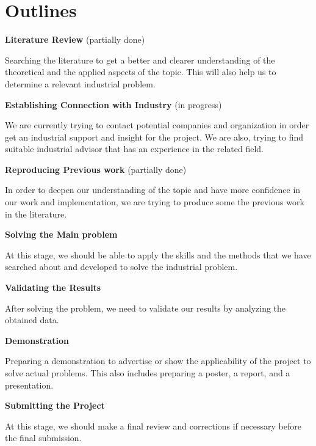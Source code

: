 \section*{Outlines}
\begin{itemize}
    {\item \textbf{Literature Review} {\footnotesize(partially done)}}

    Searching the literature to get a better and clearer understanding of the theoretical 
    and the applied aspects of the topic. This will also help us to determine a relevant industrial problem.

    {\item \textbf{Establishing Connection with Industry}
    {\footnotesize(in progress)}}

    We are currently trying to contact potential companies and organization in order get an industrial 
    support and insight for the project. We are also, trying to find suitable industrial advisor 
    that has an experience in the related field.

    {\item \textbf{Reproducing Previous work} {\footnotesize(partially done)}}

    In order to deepen our understanding of the topic and have more confidence in our work and implementation, 
    we are trying to produce some the previous work in the literature.

    {\item \textbf{Solving the Main problem }}
    
    At this stage, we should be able to apply the skills and the methods that 
    we have searched about and developed to solve the industrial problem.

     {\item \textbf{Validating the Results }}

     After solving the problem, we need to validate our results by analyzing the obtained data.

    {\item \textbf{Demonstration}} 

    Preparing a demonstration to advertise or show the applicability of the project to solve actual problems. 
    This also includes preparing a poster, a report, and a presentation.

    {\item \textbf{Submitting the Project}} 
    
    At this stage, we should make a final review and corrections if necessary before the final submission. 
\end{itemize}